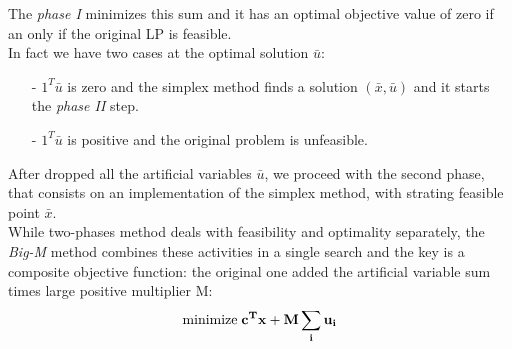 \documentclass[a4paper,10 pt,titlepage,twoside]{book}
\theoremstyle{plain}
\theoremstyle{definition}
\theoremstyle{remark}
\begin{document}
The \textit{phase I} minimizes this sum and it has an optimal objective value of zero if an only if the original LP is feasible. \\In fact we have two cases at the optimal solution $\bar{u}$: 
\begin{itemize}
	\item[-]$1^{T}\bar{u}$ is zero and the simplex method finds a solution $(\bar{x},\bar{u})$ and it starts the \textit{phase II} step.
	\item[-]$1^{T}\bar{u}$ is positive and the original problem is unfeasible.\\
\end{itemize}
After dropped all the artificial variables $\bar{u}$, we proceed with the second phase, that consists on an implementation of the simplex method, with strating feasible point $\bar{x}$.\\ 
While two-phases method deals with feasibility and optimality separately, the \textit{Big-M} method combines these activities in a single search and the key is a composite objective function: the original one added the artificial variable sum times  large positive multiplier M:\\
\begin{equation}
\text{minimize\;}\mathbf{c^{T}x+M \sum_{i}{u}_{i}}\\
\end{equation}  
\end{document}
